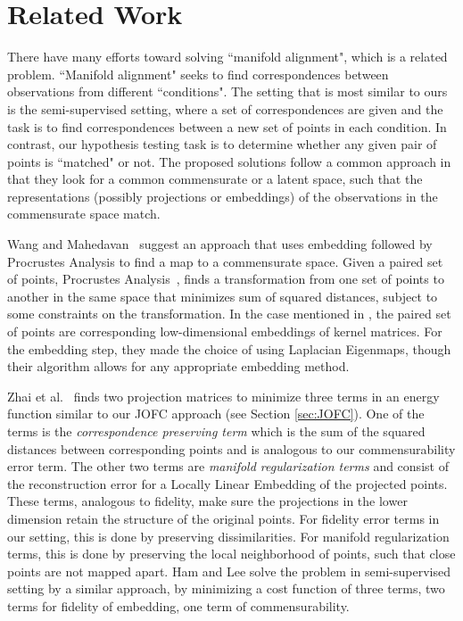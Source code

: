 \documentclass[11pt]{article} %
\begin{document}
\section{Related Work \label{sec:RelatedWork}}
There have many efforts toward solving ``manifold alignment", which is a related  problem. ``Manifold alignment" seeks to find correspondences between observations from different ``conditions". The setting that is most similar to ours is the semi-supervised setting, where a set of correspondences are given and the task is to find correspondences between a new set of points in each condition. In contrast, our hypothesis testing task is to determine whether any given pair of points is ``matched" or not. The proposed solutions follow a common approach in that they look for a common commensurate or a latent space, such that the representations (possibly projections or embeddings) of the observations in the commensurate space match.

Wang and Mahedavan~\cite{Wang2008} suggest an  approach that uses embedding followed by Procrustes Analysis to find a map to a commensurate space. Given a paired set of points, Procrustes Analysis~\cite{Sibson}, finds a transformation from one set of points to another in the same space that minimizes sum of squared distances, subject to some constraints on the transformation. In the case mentioned in \cite{Wang2008}, the paired set of points are corresponding low-dimensional embeddings of kernel matrices.   For the embedding step, they made the choice of using Laplacian Eigenmaps, though their algorithm allows for any appropriate embedding method.

 Zhai et al.~\cite{Zhai2010}  finds two projection matrices to minimize three terms in an energy function similar to our JOFC approach (see Section \ref{sec:JOFC}). One of the terms is the \emph{correspondence preserving term} which is the sum of the squared distances between corresponding points and is analogous to our commensurability error term. The other two terms are \emph{manifold regularization terms} and consist of the reconstruction error for a Locally Linear Embedding of the projected points. These terms, analogous to fidelity, make sure the projections in the lower dimension retain the structure of the original points. For fidelity error terms in our setting, this is done by preserving dissimilarities. For manifold regularization terms, this is done by preserving the local neighborhood of points, such that close points are not mapped apart.
Ham and Lee solve the problem in semi-supervised setting by a similar approach, by minimizing a cost function of three terms, two terms for fidelity of embedding, one term of commensurability.
\end{document}

